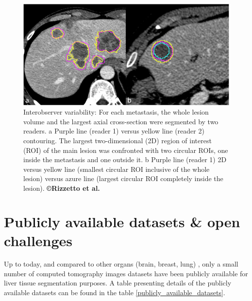 \begin{figure}[!h]
	\centering        
	\includegraphics[width=0.7\linewidth]{./images/interObs1}
	\caption{Interobserver variability: For each metastasis, the whole lesion volume and the largest axial cross-section were segmented by two readers. a Purple line (reader 1) versus yellow line (reader 2) contouring. The largest two-dimensional (2D) region of interest (ROI) of the main lesion was confronted with two circular ROIs, one inside the metastasis and one outside it. b Purple line (reader 1) 2D versus yellow line (smallest circular ROI inclusive of the whole lesion) versus azure line (largest circular ROI completely inside the lesion). \textbf{©Rizzetto et al. \cite{Rizzetto2020}}}
	\label{interobserver_var}
\end{figure} 

\section{Publicly available datasets \& open challenges}

Up to today, and compared to other organs (brain, breast, lung) \cite{GrandChallenge}, only
a small number of computed tomography images datasets have been publicly
available for liver tissue segmentation purposes. A table presenting
details of the publicly available datasets can be found in the table \ref{publicly_available_datasets}.



